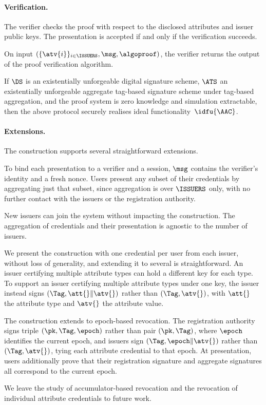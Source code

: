 \paragraph{Verification.} The verifier checks the proof with respect to the
disclosed attributes and issuer public keys. The presentation is accepted if and
only if the verification succeeds.

On input $(\{\atv{i}\}_{i \in \ISSUERS}, \msg, \algoproof)$, the verifier
returns the output of the proof verification algorithm.

\begin{theorem}\label{thm:agg-creds-construction-security} If $\DS$ is an
existentially unforgeable digital signature scheme, $\ATS$ an existentially
unforgeable aggregate tag-based signature scheme under tag-based aggregation,
and the proof system is zero knowledge and simulation extractable, then the above protocol securely realises ideal
functionality~$\idfu{\AAC}$.  \end{theorem}

\paragraph{Extensions.} The construction supports several straightforward
extensions.

To bind each presentation to a verifier and a session, $\msg$ contains the
verifier's identity and a fresh nonce. Users present any subset of their
credentials by aggregating just that subset, since aggregation is over
$\ISSUERS$ only, with no further contact with the issuers or the registration
authority.

New issuers can join the system without impacting the construction. The
aggregation of credentials and their presentation is agnostic to the number of
issuers.

We present the construction with one credential per user from each issuer,
without loss of generality, and extending it to several is straightforward. An
issuer certifying multiple attribute types can hold a different key for each
type. To support an issuer certifying multiple attribute types under one key,
the issuer instead signs $(\Tag, \att{} \| \atv{})$ rather than $(\Tag,
\atv{})$, with $\att{}$ the attribute type and $\atv{}$ the attribute value.

The construction extends to epoch-based revocation. The registration authority
signs triple $(\pk, \Tag, \epoch)$ rather than pair $(\pk, \Tag)$, where
$\epoch$ identifies the current epoch, and issuers sign $(\Tag, \epoch \|
\atv{})$ rather than $(\Tag, \atv{})$, tying each attribute credential to that
epoch. At presentation, users additionally prove that their registration
signature and aggregate signatures all correspond to the current epoch.

We leave the study of accumulator-based revocation and the revocation of
individual attribute credentials to future work.
